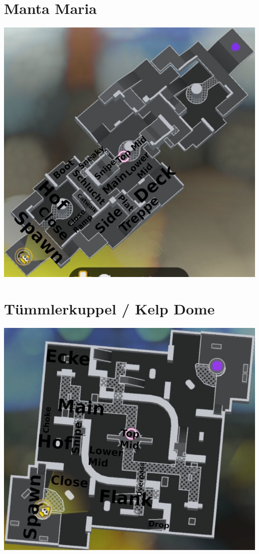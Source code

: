 \documentclass{scrreprt}
\begin{document}
\section{Manta Maria}
\includegraphics[width=\linewidth]{img/mantamaria.png}
\section{Tümmlerkuppel / Kelp Dome}
\includegraphics[width=\linewidth]{img/kelpdome.png}
\end{document}
